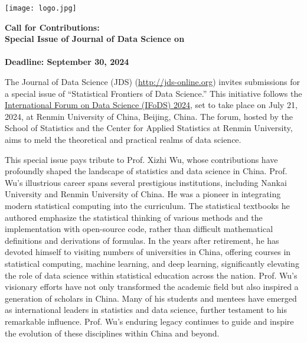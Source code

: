 \documentclass[12pt]{article}
\begin{document}
\pagestyle{empty}


\noindent
\begin{minipage}[m]{1.74in}
\texttt{[image: logo.jpg]}
\end{minipage}
\hfill
\begin{minipage}[m]{5in}
\begin{center}
  {\color{dukeblue}
    {\bf\LARGE Call for Contributions:}}\\[1ex]
  {\bf\large Special Issue of Journal of Data Science on}\\[1ex]
  {\color{dukeblue}{\bf\large  Statistical Frontiers of Data Science}\\[1ex]
  {\bf Deadline: September 30, 2024}}
\end{center}
\end{minipage}

\bigskip

The Journal of Data Science (JDS) (\url{http://jds-online.org})
invites submissions for a special issue of ``Statistical Frontiers of
Data Science.''  This initiative follows the
\href{https://statds.org/events/ifods2024}{International Forum on Data
  Science (IFoDS) 2024}, set to take place on July 21, 2024, at
Renmin University of China, Beijing, China. The forum, hosted by the
School of Statistics and the Center for Applied Statistics at Renmin
University, aims to meld the theoretical and practical realms of data
science.


This special issue pays tribute to Prof. Xizhi Wu, whose contributions
have profoundly shaped the landscape of statistics and data science in
China. Prof. Wu's illustrious career spans several prestigious institutions,
including Nankai University and Renmin University of China. 
He was a pioneer in integrating modern statistical
computing into the curriculum. The statistical textbooks he authored emphasize 
the statistical thinking of various methods and the implementation with open-source code, 
rather than difficult mathematical definitions and derivations of formulas. 
In the years after retirement, he has devoted himself to visiting numbers of universities in China, 
offering courses in statistical computing, machine learning, and deep learning, 
significantly elevating the role of data science within statistical education across the
nation. Prof. Wu's visionary efforts have not only transformed the
academic field but also inspired a generation of scholars in
China. Many of his students and mentees have emerged as international
leaders in statistics and data science, further testament to his
remarkable influence. Prof. Wu's enduring legacy continues to guide
and inspire the evolution of these disciplines within China and
beyond.
\end{document}
